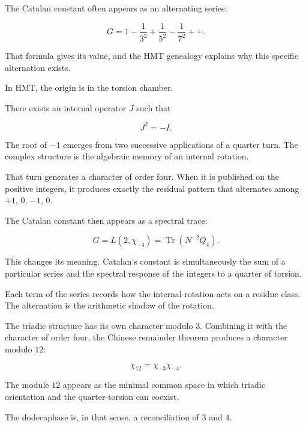 The Catalan constant often appears as an alternating series:\par

\[
G
=
1-\frac1{3^2}+\frac1{5^2}-\frac1{7^2}+\cdots.
\]

That formula gives its value, and the HMT genealogy explains why this specific alternation exists.\par

In HMT, the origin is in the torsion chamber.\par

There exists an internal operator \(J\) such that\par

\[
J^2=-I.
\]

The root of \(-1\) emerges from two successive applications of a
quarter turn. The complex structure is the algebraic memory of an internal
rotation.\par

That turn generates a character of order four. When it is published on the positive integers, it produces exactly the residual pattern that alternates among \(+1\), \(0\), \(-1\), \(0\).\par

The Catalan constant then appears as a spectral trace:\par

\[
G
=
L(2,\chi_{-4})
=
\operatorname{Tr}(N^{-2}Q_4).
\]

This changes its meaning. Catalan's constant is simultaneously the sum of a particular series and the spectral response of the integers to a quarter of torsion.\par

Each term of the series records how the internal rotation acts on a residue class. The alternation is the arithmetic shadow of the rotation.\par

The triadic structure has its own character modulo \(3\). Combining it with the character of order four, the Chinese remainder theorem produces a character modulo \(12\):\par

\[
\chi_{12}
=
\chi_{-3}\chi_{-4}.
\]

The module \(12\) appears as the minimal common space in which triadic orientation and the quarter-torsion can coexist.\par

The dodecaphase is, in that sense, a reconciliation of \(3\) and \(4\).\par

